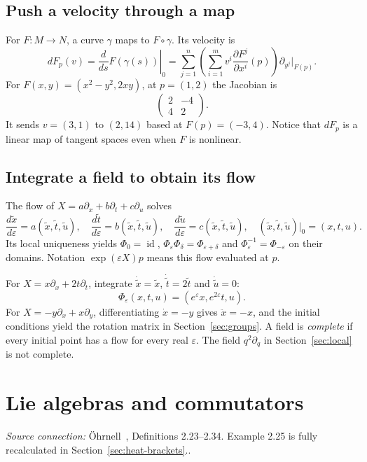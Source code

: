 \documentclass[11pt,a4paper]{article}
\numberwithin{equation}{section}
\theoremstyle{definition}
\theoremstyle{plain}
\theoremstyle{remark}
\newcommand{\id}{\operatorname{id}}
\newcommand{\source}[1]{\textit{Source connection:} \"Ohrnell~\cite{ohrnell}, #1.}
\begin{document}
\subsection{Push a velocity through a map}
For $F:M\to N$, a curve $\gamma$ maps to $F\circ\gamma$. Its velocity is
\[
dF_p(v)=\left.\frac d{ds}F(\gamma(s))\right|_0
=\sum_{j=1}^{n}\left(\sum_{i=1}^{m}v^i\frac{\partial F^j}{\partial x^i}(p)\right)\partial_{y^j}\big|_{F(p)}.
\]
For $F(x,y)=(x^2-y^2,2xy)$, at $p=(1,2)$ the Jacobian is
\[
\begin{pmatrix}2&-4\\4&2\end{pmatrix}.
\]
It sends $v=(3,1)$ to $(2,14)$ based at $F(p)=(-3,4)$. Notice that $dF_p$ is a linear map of tangent spaces even when $F$ is nonlinear.

\subsection{Integrate a field to obtain its flow}\label{sec:flows}
The flow of $X=a\partial_x+b\partial_t+c\partial_u$ solves
\[
\frac{d\widetilde x}{d\varepsilon}=a(\widetilde x,\widetilde t,\widetilde u),\quad
\frac{d\widetilde t}{d\varepsilon}=b(\widetilde x,\widetilde t,\widetilde u),\quad
\frac{d\widetilde u}{d\varepsilon}=c(\widetilde x,\widetilde t,\widetilde u),
\quad(\widetilde x,\widetilde t,\widetilde u)|_0=(x,t,u).
\]
Its local uniqueness yields $\Phi_0=\id$, $\Phi_\varepsilon\Phi_\delta=\Phi_{\varepsilon+\delta}$ and $\Phi_\varepsilon^{-1}=\Phi_{-\varepsilon}$ on their domains. Notation $\exp(\varepsilon X)p$ means this flow evaluated at $p$.

For $X=x\partial_x+2t\partial_t$, integrate $\dot{\widetilde x}=\widetilde x$, $\dot{\widetilde t}=2\widetilde t$ and $\dot{\widetilde u}=0$:
\[
\Phi_\varepsilon(x,t,u)=(e^\varepsilon x,e^{2\varepsilon}t,u).
\]
For $X=-y\partial_x+x\partial_y$, differentiating $\dot x=-y$ gives $\ddot x=-x$, and the initial conditions yield the rotation matrix in Section~\ref{sec:groups}. A field is \emph{complete} if every initial point has a flow for every real $\varepsilon$. The field $q^2\partial_q$ in Section~\ref{sec:local} is not complete.

\section{Lie algebras and commutators}\label{sec:algebra}
\source{Definitions 2.23--2.34. Example 2.25 is fully recalculated in Section~\ref{sec:heat-brackets}.}
\end{document}
